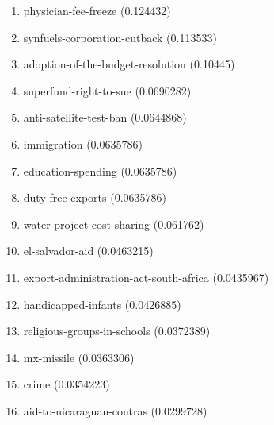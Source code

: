 \begin{enumerate}
\item physician-fee-freeze (0.124432)
\item synfuels-corporation-cutback (0.113533)
\item adoption-of-the-budget-resolution (0.10445)
\item superfund-right-to-sue (0.0690282)
\item anti-satellite-test-ban (0.0644868)
\item immigration (0.0635786)
\item education-spending (0.0635786)
\item duty-free-exports (0.0635786)
\item water-project-cost-sharing (0.061762)
\item el-salvador-aid (0.0463215)
\item export-administration-act-south-africa (0.0435967)
\item handicapped-infants (0.0426885)
\item religious-groups-in-schools (0.0372389)
\item mx-missile (0.0363306)
\item crime (0.0354223)
\item aid-to-nicaraguan-contras (0.0299728)
\end{enumerate}